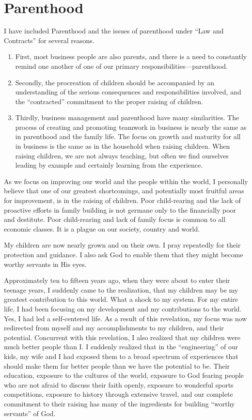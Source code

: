 \documentclass[12pt]{memoir}
\begin{document}
\section{Parenthood}

I have included Parenthood and the issues of parenthood under ``Law
and Contracts'' for several reasons. 
\begin{enumerate}
\item First, most business people are also parents, and there is a need
to constantly remind one another of one of our primary responsibilities---parenthood.
\item Secondly, the procreation of children should be accompanied by an
understanding of the serious consequences and responsibilities involved,
and the ``contracted'' commitment to the proper raising of children.
\item Thirdly, business management and parenthood have many similarities.
The process of creating and promoting teamwork in business is nearly
the same as in parenthood and the family life. The focus on growth
and maturity for all in business is the same as in the household when
raising children. When raising children, we are not always teaching,
but often we find ourselves leading by example and certainly learning
from the experience. 
\end{enumerate}
As we focus on improving our world and the people within the world,
I personally believe that one of our greatest shortcomings, and potentially
most fruitful areas for improvement, is in the raising of children.
Poor child-rearing and the lack of proactive efforts in family building
is not germane only to the financially poor and destitute. Poor child-rearing
and lack of family focus is common to all economic classes. It is
a plague on our society, country and world.

My children are now nearly grown and on their own. I pray repeatedly
for their protection and guidance. I also ask God to enable them that
they might become worthy servants in His eyes.

Approximately ten to fifteen years ago, when they were about to enter
their teenage years, I suddenly came to the realization, that my children
may be my greatest contribution to this world. What a shock to my
system. For my entire life, I had been focusing on my development
and my contributions to the world. Yes, I had led a self-centered
life. As a result of this revelation, my focus was now redirected
from myself and my accomplishments to my children, and their potential.
Concurrent with this revelation, I also realized that my children
were much better people than I. I suddenly realized that in the ``engineering''
of our kids, my wife and I had exposed them to a broad spectrum of
experiences that should make them far better people than we have the
potential to be. Their education, exposure to the cultures of the
world, exposure to God fearing people who are not afraid to discuss
their faith openly, exposure to wonderful sports competitions, exposure
to history through extensive travel, and our complete commitment to
their raising has many of the ingredients for building ``worthy servants''
of God.
\end{document}
